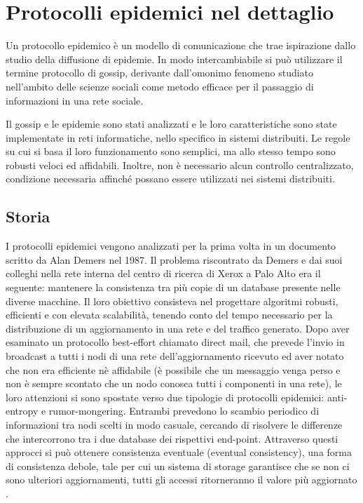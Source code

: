\newpage
\chapter{Protocolli epidemici nel dettaglio}
\label{chap:epidemic}
Un protocollo epidemico è un modello di comunicazione che trae ispirazione dallo studio della diffusione di epidemie. In modo intercambiabile si può utilizzare il termine protocollo di gossip, derivante dall'omonimo fenomeno studiato nell'ambito delle scienze sociali come metodo efficace per il passaggio di informazioni in una rete sociale.

Il gossip e le epidemie sono stati analizzati e le loro caratteristiche sono state implementate in reti informatiche, nello specifico in sistemi distribuiti. Le regole su cui si basa il loro funzionamento sono semplici, ma allo stesso tempo sono robusti veloci ed affidabili. Inoltre, non è necessario alcun controllo centralizzato, condizione necessaria affinché possano essere utilizzati nei sistemi distribuiti.

\section{Storia}
I protocolli epidemici vengono analizzati per la prima volta in un documento scritto da Alan Demers \cite{demers} nel 1987. Il problema riscontrato da Demers e dai suoi colleghi nella rete interna del centro di ricerca di Xerox a Palo Alto era il seguente: mantenere la consistenza tra più copie di un database presente nelle diverse macchine. Il loro obiettivo consisteva nel progettare algoritmi robusti, efficienti e con elevata scalabilità, tenendo conto del tempo necessario per la distribuzione di un aggiornamento in una rete e del traffico generato. Dopo aver esaminato un protocollo best-effort chiamato direct mail, che prevede l'invio in broadcast a tutti i nodi di una rete dell'aggiornamento ricevuto ed aver notato che non era efficiente nè affidabile (è possibile che un messaggio venga perso e non è sempre scontato che un nodo conosca tutti i componenti in una rete), le loro attenzioni si sono spostate verso due tipologie di protocolli epidemici: anti-entropy e rumor-mongering. Entrambi prevedono lo scambio periodico di informazioni tra nodi scelti in modo casuale, cercando di risolvere le differenze che intercorrono tra i due database dei rispettivi end-point. Attraverso questi approcci si può ottenere consistenza eventuale (eventual consistency), una forma di consistenza debole, tale per cui un sistema di storage garantisce che se non ci sono ulteriori aggiornamenti, tutti gli accessi ritorneranno il valore più aggiornato \cite{vogels}.

